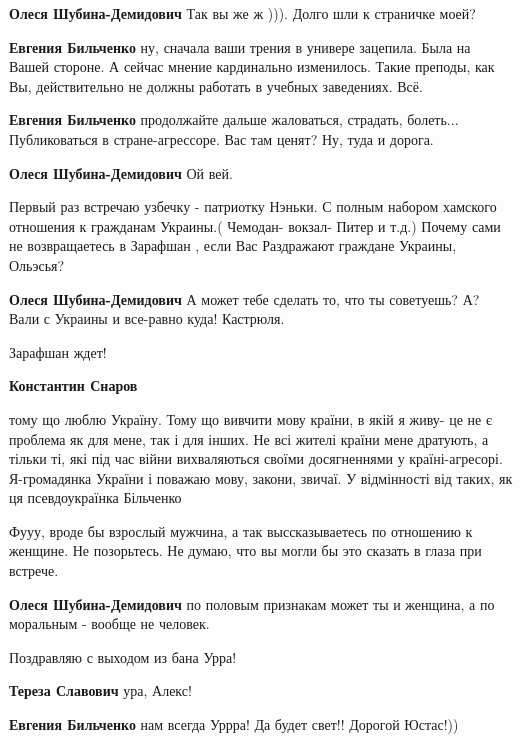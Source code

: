 \begin{itemize}
\begin{itemize}
\textbf{Олеся Шубина-Демидович} Так вы же ж ))). Долго шли к страничке моей?

\textbf{Евгения Бильченко} ну, сначала ваши трения в универе зацепила. Была на Вашей стороне. А сейчас мнение кардинально изменилось. Такие преподы, как Вы, действительно не должны работать в учебных заведениях. Всё.

\textbf{Евгения Бильченко} продолжайте дальше жаловаться, страдать, болеть... Публиковаться в стране-агрессоре. Вас там ценят? Ну, туда и дорога.

\textbf{Олеся Шубина-Демидович} Ой вей.


Первый раз встречаю узбечку - патриотку Нэньки. С полным набором хамского
отношения к гражданам Украины.( Чемодан- вокзал- Питер и т.д.) Почему сами не
возвращаетесь в Зарафшан , если Вас Раздражают граждане Украины, Ольэсья?

\textbf{Олеся Шубина-Демидович} А может тебе сделать то, что ты советуешь? А? Вали с Украины и все-равно куда! Кастрюля.

Зарафшан ждет!

\textbf{Константин Снаров} 

тому що люблю Україну. Тому що вивчити мову країни, в якій я живу- це не є
проблема як для мене, так і для інших. Не всі жителі країни мене дратують, а
тільки ті, які під час війни вихваляються своїми досягненнями у
країні-агресорі. Я-громадянка України і поважаю мову, закони, звичаї. У
відмінності від таких, як ця псевдоукраїнка Більченко



Фууу, вроде бы взрослый мужчина, а так выссказываетесь по отношению к женщине.
Не позорьтесь. Не думаю, что вы могли бы это сказать в глаза при встрече.

\textbf{Олеся Шубина-Демидович} по половым признакам может ты и женщина, а по моральным - вообще не человек.
\end{itemize} %

Поздравляю с выходом из бана Урра!

\begin{itemize} %
\textbf{Тереза Славович} ура, Алекс!

\textbf{Евгения Бильченко} нам всегда Уррра! Да будет свет!! Дорогой Юстас!))


\end{itemize}
\end{itemize}
